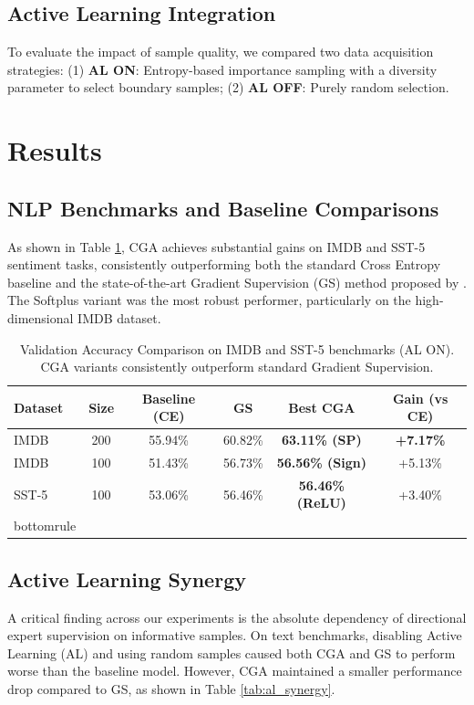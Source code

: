 \documentclass[sigconf,anonymous]{aamas}
\begin{document}
\subsection{Active Learning Integration}
To evaluate the impact of sample quality, we compared two data acquisition strategies: (1) \textbf{AL ON}: Entropy-based importance sampling with a diversity parameter to select boundary samples; (2) \textbf{AL OFF}: Purely random selection.

\section{Results}
\label{sec:results}

\subsection{NLP Benchmarks and Baseline Comparisons}
As shown in Table \ref{tab:nlp_results}, CGA achieves substantial gains on IMDB and SST-5 sentiment tasks, consistently outperforming both the standard Cross Entropy baseline and the state-of-the-art Gradient Supervision (GS) method proposed by \cite{teney2020learning}. The Softplus variant was the most robust performer, particularly on the high-dimensional IMDB dataset.

\begin{table}[h]
\centering
\caption{Validation Accuracy Comparison on IMDB and SST-5 benchmarks (AL ON). CGA variants consistently outperform standard Gradient Supervision.}
\label{tab:nlp_results}
\begin{tabular}{@{}lccccc@{}}
\toprule
\textbf{Dataset} & \textbf{Size} & \textbf{Baseline (CE)} & \textbf{GS \cite{teney2020learning}} & \textbf{Best CGA} & \textbf{Gain (vs CE)} \\ \midrule
IMDB & 200 & 55.94\% & 60.82\% & \textbf{63.11\% (SP)} & \textbf{+7.17\%}
 \\IMDB & 100 & 51.43\% & 56.73\% & \textbf{56.56\% (Sign)} & +5.13\%
 \\SST-5 & 100 & 53.06\% & 56.46\% & \textbf{56.46\% (ReLU)} & +3.40\% \\bottomrule
\end{tabular}
\end{table}

\subsection{Active Learning Synergy}
A critical finding across our experiments is the absolute dependency of directional expert supervision on informative samples. On text benchmarks, disabling Active Learning (AL) and using random samples caused both CGA and GS to perform worse than the baseline model. However, CGA maintained a smaller performance drop compared to GS, as shown in Table \ref{tab:al_synergy}.
\end{document}
